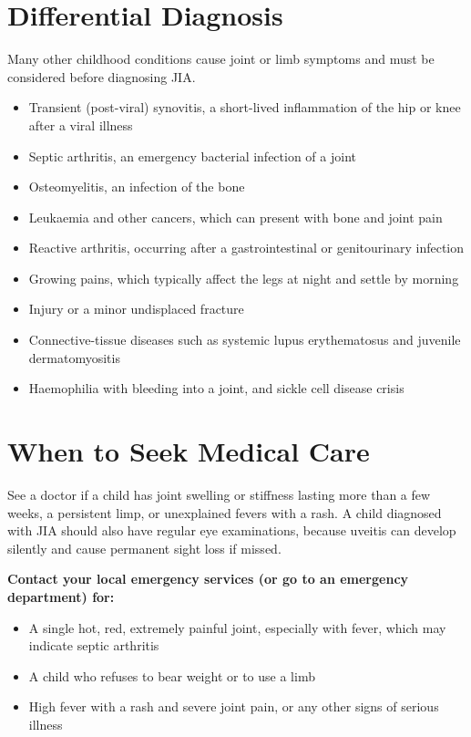 \section*{Differential Diagnosis}
Many other childhood conditions cause joint or limb symptoms and must be considered before diagnosing JIA.

\begin{itemize}
    \item Transient (post-viral) synovitis, a short-lived inflammation of the hip or knee after a viral illness
    \item Septic arthritis, an emergency bacterial infection of a joint
    \item Osteomyelitis, an infection of the bone
    \item Leukaemia and other cancers, which can present with bone and joint pain
    \item Reactive arthritis, occurring after a gastrointestinal or genitourinary infection
    \item Growing pains, which typically affect the legs at night and settle by morning
    \item Injury or a minor undisplaced fracture
    \item Connective-tissue diseases such as systemic lupus erythematosus and juvenile dermatomyositis
    \item Haemophilia with bleeding into a joint, and sickle cell disease crisis
\end{itemize}

\section*{When to Seek Medical Care}
See a doctor if a child has joint swelling or stiffness lasting more than a few weeks, a persistent limp, or unexplained fevers with a rash. A child diagnosed with JIA should also have regular eye examinations, because uveitis can develop silently and cause permanent sight loss if missed.

\textbf{Contact your local emergency services (or go to an emergency department) for:}
\begin{itemize}
    \item A single hot, red, extremely painful joint, especially with fever, which may indicate septic arthritis
    \item A child who refuses to bear weight or to use a limb
    \item High fever with a rash and severe joint pain, or any other signs of serious illness
\end{itemize}

